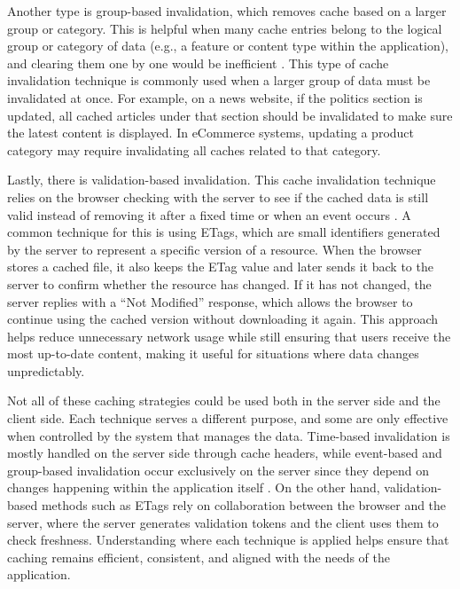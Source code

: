 Another type is group-based invalidation, which removes cache based on a larger group or category.
This is helpful when many cache entries belong to the logical group or category of data (e.g., a feature or content type within the application),
and clearing them one by one would be inefficient \cite{Redis_2025}.
This type of cache invalidation technique is commonly used when a larger group of data must be invalidated at once.
For example, on a news website, if the politics section is updated, all cached articles under that section should be
invalidated to make sure the latest content is displayed. In eCommerce systems, updating a product category may require invalidating all caches related to that category.

Lastly, there is validation-based invalidation. This cache invalidation technique relies on the browser checking with the server to see if
the cached data is still valid instead of removing it after a fixed time or when an event occurs \cite{Redis_2025}.
A common technique for this is using ETags, which are small identifiers generated by the server to represent a specific version of a resource.
When the browser stores a cached file, it also keeps the ETag value and later sends it back to the server to confirm whether the resource has changed.
If it has not changed, the server replies with a “Not Modified” response, which allows the browser to continue using the cached version without downloading it again.
This approach helps reduce unnecessary network usage while still ensuring that users receive the most up-to-date content,
making it useful for situations where data changes unpredictably.

Not all of these caching strategies could be used both in the server side and the client side. 
Each technique serves a different purpose, and some are only effective when controlled by the system that manages the data.
Time-based invalidation is mostly handled on the server side through cache headers,
while event-based and group-based invalidation occur exclusively on the server since they depend on changes happening within the application itself \cite{Redis_2025}.
On the other hand, validation-based methods such as ETags rely on collaboration between the browser and the server,
where the server generates validation tokens and the client uses them to check freshness.
Understanding where each technique is applied helps ensure that caching remains efficient, consistent, and aligned with the needs of the application.


